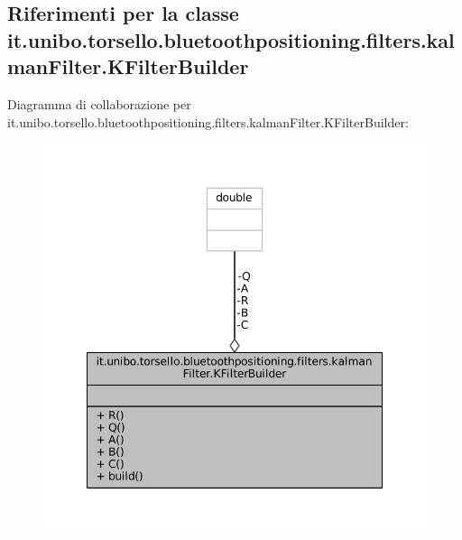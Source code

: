 \hypertarget{classit_1_1unibo_1_1torsello_1_1bluetoothpositioning_1_1filters_1_1kalmanFilter_1_1KFilterBuilder}{}\subsection{Riferimenti per la classe it.\+unibo.\+torsello.\+bluetoothpositioning.\+filters.\+kalman\+Filter.\+K\+Filter\+Builder}
\label{classit_1_1unibo_1_1torsello_1_1bluetoothpositioning_1_1filters_1_1kalmanFilter_1_1KFilterBuilder}


Diagramma di collaborazione per it.\+unibo.\+torsello.\+bluetoothpositioning.\+filters.\+kalman\+Filter.\+K\+Filter\+Builder\+:
\nopagebreak
\begin{figure}[H]
\begin{center}
\leavevmode
\includegraphics[width=348pt]{classit_1_1unibo_1_1torsello_1_1bluetoothpositioning_1_1filters_1_1kalmanFilter_1_1KFilterBuilder__coll__graph}
\end{center}
\end{figure}
